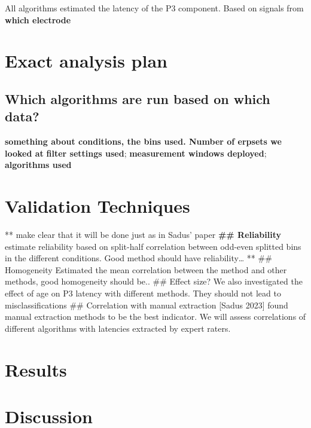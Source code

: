 \documentclass[
  man,floatsintext]{apa7}
\begin{document}
All algorithms estimated the latency of the P3 component. Based on signals from \textbf{which electrode}

\hypertarget{exact-analysis-plan}{%
\section{Exact analysis plan}\label{exact-analysis-plan}}

\hypertarget{which-algorithms-are-run-based-on-which-data}{%
\subsection{Which algorithms are run based on which data?}\label{which-algorithms-are-run-based-on-which-data}}

\textbf{something about conditions, the bins used. Number of erpsets we looked at}
\textbf{filter settings used}; \textbf{measurement windows deployed}; \textbf{algorithms used}

\hypertarget{validation-techniques}{%
\section{Validation Techniques}\label{validation-techniques}}

** make clear that it will be done just as in Sadus' paper \textbf{
\#\# Reliability
} estimate reliability based on split-half correlation between odd-even splitted bins in the different conditions. Good method should have reliability\ldots{} **
\#\# Homogeneity
Estimated the mean correlation between the method and other methods, good homogeneity should be..
\#\# Effect size?
We also investigated the effect of age on P3 latency with different methods. They should not lead to misclassifications
\#\# Correlation with manual extraction
{[}Sadus 2023{]} found manual extraction methods to be the best indicator. We will assess correlations of different algorithms with latencies extracted by expert raters.

\hypertarget{results}{%
\section{Results}\label{results}}

\hypertarget{discussion}{%
\section{Discussion}\label{discussion}}
\end{document}
